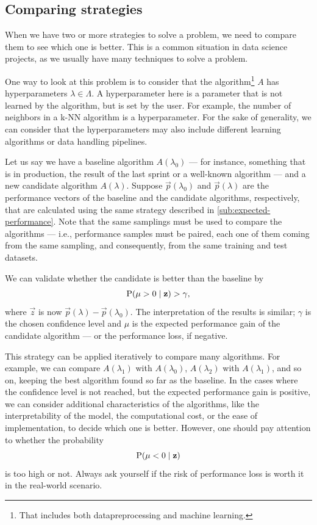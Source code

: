 \subsection{Comparing strategies}
\label{sub:comparison}

When we have two or more strategies to solve a problem, we need to compare them to see
which one is better.  This is a common situation in data science projects, as we usually
have many techniques to solve a problem.

One way to look at this problem is to consider that the algorithm\footnote{That includes
both \gls{datapreprocessing} and machine learning.} $A$ has \glspl{hyperparameter} $\lambda \in
\Lambda$.  A \gls{hyperparameter} here is a parameter that is not learned by the algorithm, but
is set by the user.  For example, the number of neighbors in a k-NN algorithm is a
\gls{hyperparameter}.  For the sake of generality, we can consider that the \glspl{hyperparameter} may
also include different learning algorithms or data handling pipelines.

Let us say we have a baseline algorithm $A(\lambda_0)$ --- for instance, something that is
in production, the result of the last sprint or a well-known algorithm --- and a new candidate algorithm $A(\lambda)$.
Suppose $\vec{p}(\lambda_0)$ and $\vec{p}(\lambda)$ are the performance vectors of the
baseline and the candidate algorithms, respectively, that are calculated using the same
strategy described in \cref{sub:expected-performance}.  Note that the
same samplings must be used to compare the algorithms --- i.e., performance samples must be
paired, each one of them coming from the same sampling, and consequently, from the same
training and test datasets.

We can validate whether the
candidate is better than the baseline by
\begin{equation*}
  \operatorname{P}(\mu > 0 \mid \mathbf{z}) > \gamma\text{,}
\end{equation*}
where $\vec{z}$ is now $\vec{p}(\lambda) - \vec{p}(\lambda_0)$.  The interpretation of the
results is similar; $\gamma$ is the chosen confidence level and $\mu$ is the expected
performance gain of the candidate algorithm --- or the performance loss, if negative.

This strategy can be applied iteratively to compare many algorithms.  For example, we can
compare $A(\lambda_1)$ with $A(\lambda_0)$, $A(\lambda_2)$ with $A(\lambda_1)$, and so on,
keeping the best algorithm found so far as the baseline. In the cases where the confidence
level is not reached, but the expected performance gain is positive, we can consider
additional characteristics of the algorithms, like the interpretability of the \gls{model}, the
computational cost, or the ease of implementation, to decide which one is better. However,
one should pay attention to whether the probability
\begin{equation*}
  \operatorname{P}(\mu < 0 \mid \mathbf{z})
\end{equation*}
is too high or not.  Always ask yourself if the risk of performance loss is worth it in
the real-world scenario.

